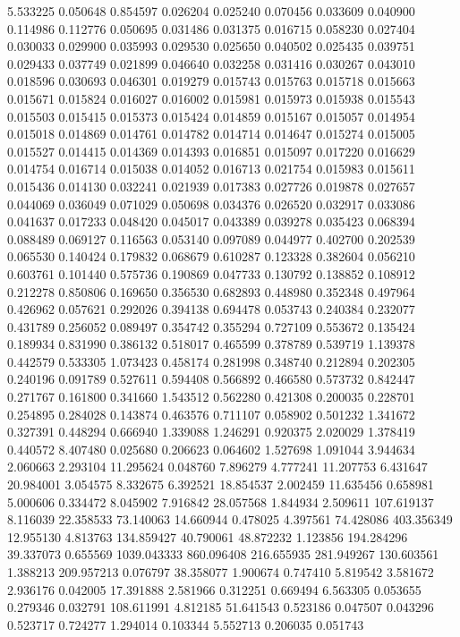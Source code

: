 5.533225
0.050648
0.854597
0.026204
0.025240
0.070456
0.033609
0.040900
0.114986
0.112776
0.050695
0.031486
0.031375
0.016715
0.058230
0.027404
0.030033
0.029900
0.035993
0.029530
0.025650
0.040502
0.025435
0.039751
0.029433
0.037749
0.021899
0.046640
0.032258
0.031416
0.030267
0.043010
0.018596
0.030693
0.046301
0.019279
0.015743
0.015763
0.015718
0.015663
0.015671
0.015824
0.016027
0.016002
0.015981
0.015973
0.015938
0.015543
0.015503
0.015415
0.015373
0.015424
0.014859
0.015167
0.015057
0.014954
0.015018
0.014869
0.014761
0.014782
0.014714
0.014647
0.015274
0.015005
0.015527
0.014415
0.014369
0.014393
0.016851
0.015097
0.017220
0.016629
0.014754
0.016714
0.015038
0.014052
0.016713
0.021754
0.015983
0.015611
0.015436
0.014130
0.032241
0.021939
0.017383
0.027726
0.019878
0.027657
0.044069
0.036049
0.071029
0.050698
0.034376
0.026520
0.032917
0.033086
0.041637
0.017233
0.048420
0.045017
0.043389
0.039278
0.035423
0.068394
0.088489
0.069127
0.116563
0.053140
0.097089
0.044977
0.402700
0.202539
0.065530
0.140424
0.179832
0.068679
0.610287
0.123328
0.382604
0.056210
0.603761
0.101440
0.575736
0.190869
0.047733
0.130792
0.138852
0.108912
0.212278
0.850806
0.169650
0.356530
0.682893
0.448980
0.352348
0.497964
0.426962
0.057621
0.292026
0.394138
0.694478
0.053743
0.240384
0.232077
0.431789
0.256052
0.089497
0.354742
0.355294
0.727109
0.553672
0.135424
0.189934
0.831990
0.386132
0.518017
0.465599
0.378789
0.539719
1.139378
0.442579
0.533305
1.073423
0.458174
0.281998
0.348740
0.212894
0.202305
0.240196
0.091789
0.527611
0.594408
0.566892
0.466580
0.573732
0.842447
0.271767
0.161800
0.341660
1.543512
0.562280
0.421308
0.200035
0.228701
0.254895
0.284028
0.143874
0.463576
0.711107
0.058902
0.501232
1.341672
0.327391
0.448294
0.666940
1.339088
1.246291
0.920375
2.020029
1.378419
0.440572
8.407480
0.025680
0.206623
0.064602
1.527698
1.091044
3.944634
2.060663
2.293104
11.295624
0.048760
7.896279
4.777241
11.207753
6.431647
20.984001
3.054575
8.332675
6.392521
18.854537
2.002459
11.635456
0.658981
5.000606
0.334472
8.045902
7.916842
28.057568
1.844934
2.509611
107.619137
8.116039
22.358533
73.140063
14.660944
0.478025
4.397561
74.428086
403.356349
12.955130
4.813763
134.859427
40.790061
48.872232
1.123856
194.284296
39.337073
0.655569
1039.043333
860.096408
216.655935
281.949267
130.603561
1.388213
209.957213
0.076797
38.358077
1.900674
0.747410
5.819542
3.581672
2.936176
0.042005
17.391888
2.581966
0.312251
0.669494
6.563305
0.053655
0.279346
0.032791
108.611991
4.812185
51.641543
0.523186
0.047507
0.043296
0.523717
0.724277
1.294014
0.103344
5.552713
0.206035
0.051743
